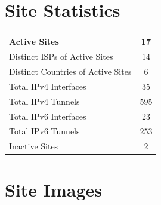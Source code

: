 \chapter{Site Statistics}
\label{cha:Site-Statistics}


\begin{small}
\begin{center}
\begin{longtable}{|c|c|}
 \hline
 \multicolumn{1}{|l|}{Active Sites} & 17 \\ \hline
 \multicolumn{1}{|l|}{Distinct ISPs of Active Sites} & 14 \\ \hline
 \multicolumn{1}{|l|}{Distinct Countries of Active Sites} & 6 \\ \hline
 \multicolumn{1}{|l|}{Total IPv4 Interfaces} & 35 \\ \hline
 \multicolumn{1}{|l|}{Total IPv4 Tunnels} & 595 \\ \hline
 \multicolumn{1}{|l|}{Total IPv6 Interfaces} & 23 \\ \hline
 \multicolumn{1}{|l|}{Total IPv6 Tunnels} & 253 \\ \hline
 \multicolumn{1}{|l|}{Inactive Sites} & 2 \\ \hline
\end{longtable}
\end{center}
\end{small}




\chapter{Site Images}
\label{cha:Images}


